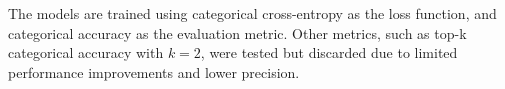 The models are trained using categorical cross-entropy as the loss function, and
categorical accuracy as the evaluation metric. Other metrics, such as top-k
categorical accuracy with $k=2$, were tested but discarded due to limited
performance improvements and lower precision.

